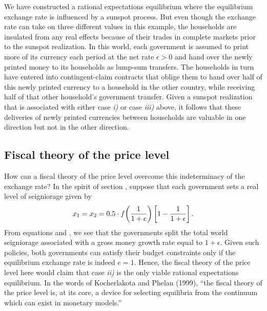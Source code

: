 We have constructed a rational expectations equilibrium where the
equilibrium exchange rate is influenced by a sunspot process. But
even though the exchange rate can take on three different values
in this example, the households are insulated from any real
effects because of their trades in complete markets prior to the
sunspot realization. In this world, each government is assumed
 to print more of its currency each period at the net rate
$\epsilon>0$ and hand over the newly printed money to its
households as lump-sum transfers. The households in turn have
entered into contingent-claim contracts that oblige them to hand
over half of this newly printed currency to a household in the
other country, while receiving half of that other household's
government transfer. Given a sunspot realization that is
associated with either case {\it i)} or case {\it iii)} above, it
follows that these deliveries of newly printed currencies between
households are valuable in one direction but not in the other
direction.



\subsection{Fiscal theory of the price level}\label{sec:FTPL_take1}%
How can a fiscal theory of the price level overcome this
indeterminacy of the exchange rate? In the spirit of section
, suppose that each government sets a
real level of seigniorage given by
$$
x_1 = x_2 = 0.5 \cdot f\!\left({1\over 1+\epsilon}\right)
              \left[1 - {1\over 1+\epsilon}\right].
$$
From equations  and , we
see that the governments  split the total world seigniorage
associated with a gross money growth rate equal to $1+\epsilon$.
Given such policies, both governments can satisfy their budget
constraints only if the equilibrium exchange rate is indeed $e=1$.
Hence, the fiscal theory of the price level here would  claim that
case {\it ii)} is the only viable rational expectations
equilibrium. In the words of Kocherlakota and Phelan (1999), ``the
fiscal theory of the price level is, at its core, a device for
selecting equilibria from the continuum which can exist in
monetary models.''

